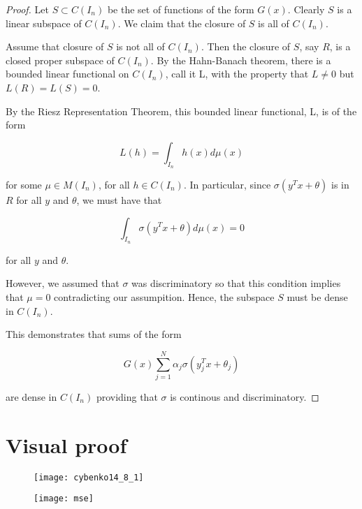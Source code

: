 \documentclass[]{article}
\theoremstyle{definition}
\begin{document}
\begin{proof}
Let $S \subset C(I_n)$ be the set of functions of the form $G(x)$. Clearly $S$ is a linear subspace of $C(I_n)$. We claim that the closure of $S$ is all of $C(I_n)$. 

Assume that closure of $S$ is not all of $C(I_n)$. Then the closure of $S$, say $R$, is a closed proper subspace of $C(I_n)$. By the Hahn-Banach theorem, there is a bounded linear functional on $C(I_n)$, call it L, with the property that $L \neq 0$ but $L(R) = L(S) = 0$.

By the Riesz Representation Theorem, this bounded linear functional, L, is of the form 

$$
L(h) = \int_{I_n} h(x)d\mu(x)
$$

for some $\mu \in M(I_n)$, for all $h \in C(I_n)$. In particular, since $\sigma(y^Tx + \theta)$ is in $R$ for all $y$ and $\theta$, we must have that

$$
\int_{I_n} \sigma \left(y^Tx + \theta \right) d\mu(x) = 0
$$

for all $y$ and $\theta$.

However, we assumed that $\sigma$ was discriminatory so that this condition implies that $\mu = 0$ contradicting our assumpition. Hence, the subspace $S$ must be dense in $C(I_n)$.

This demonstrates that sums of the form

$$
G(x) \sum_{j=1}^{N} \alpha_j \sigma\left(y_j^Tx + \theta_j\right)
$$

are dense in $C(I_n)$ providing that $\sigma$ is continous and discriminatory.

\end{proof}

\section{Visual proof}

\begin{figure}[h!]
	\centering
	\texttt{[image: cybenko14\_8\_1]}

\end{figure}

\begin{figure}[h!]
	\centering
	\texttt{[image: mse]}

\end{figure}
\end{document}
